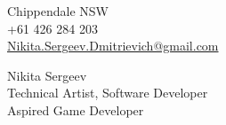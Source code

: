 \documentclass[]{cv-class}
\begin{document}
\thispagestyle{empty}

\begin{minipage}[t]{0.3\textwidth}
\vspace{4.2mm}
Chippendale NSW \\
+61 426 284 203 \\
\href{mailto:Nikita.Sergeev.Dmitrievich+CV@gmail.com}
    {Nikita.Sergeev.Dmitrievich@gmail.com}
\end{minipage}
\hfill
\begin{minipage}[t]{0.65\textwidth}
\begin{flushright}
    {\Huge
    \textcolor{candidate_name_col}{Nikita Sergeev} 
    } \\
    {\large Technical Artist, Software Developer
    \\ Aspired Game Developer
    }
\end{flushright}
\end{minipage}

\vspace{3mm}

\bigSeparator{2pt}
\end{document}
